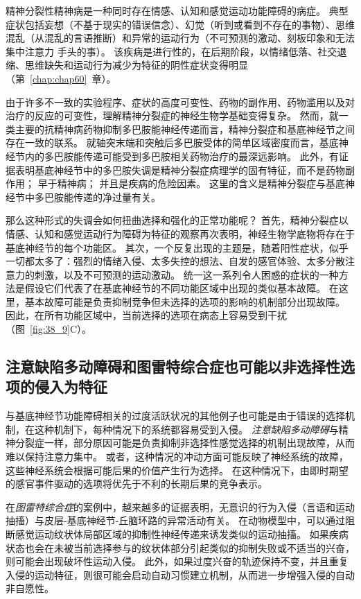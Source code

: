 精神分裂性精神病是一种同时存在情感、认知和感觉运动功能障碍的病症。
典型症状包括妄想（不基于现实的错误信念）、幻觉（听到或看到不存在的事物）、思维混乱（从混乱的言语推断）和异常的运动行为（不可预测的激动、刻板印象和无法集中注意力 手头的事）。
该疾病是进行性的，在后期阶段，以情绪低落、社交退缩、思维缺失和运动行为减少为特征的阴性症状变得明显（第~\ref{chap:chap60}~章）。


由于许多不一致的实验程序、症状的高度可变性、药物的副作用、药物滥用以及对治疗的反应的可变性，理解精神分裂症的神经生物学基础变得复杂。
然而，就一类主要的抗精神病药物抑制多巴胺能神经传递而言，精神分裂症和基底神经节之间存在一致的联系。
就轴突末端和突触后多巴胺受体的简单区域密度而言，基底神经节内的多巴胺能传递可能受到多巴胺相关药物治疗的最深远影响。
此外，有证据表明基底神经节中的多巴胺失调是精神分裂症病理学的固有特征，而不是药物副作用；
早于精神病；
并且是疾病的危险因素。
这里的含义是精神分裂症与基底神经节中多巴胺能传递的净过量有关。


那么这种形式的失调会如何扭曲选择和强化的正常功能呢？
首先，精神分裂症以情感、认知和感觉运动行为障碍为特征的观察再次表明，神经生物学底物将存在于基底神经节的每个功能区。
其次，一个反复出现的主题是，随着阳性症状，似乎一切都太多了：强烈的情绪入侵、太多失控的想法、自发的感官体验、太多分散注意力的刺激，以及不可预测的运动激动。
统一这一系列令人困惑的症状的一种方法是假设它们代表了在基底神经节的不同功能区域中出现的类似基本故障。
在这里，基本故障可能是负责抑制竞争但未选择的选项的影响的机制部分出现故障。
因此，在所有功能区域中，当前选择的选项在病态上容易受到干扰（图~\ref{fig:38_9}C）。



\subsection{注意缺陷多动障碍和图雷特综合症也可能以非选择性选项的侵入为特征}

与基底神经节功能障碍相关的过度活跃状况的其他例子也可能是由于错误的选择机制，在这种机制下，每种情况下的系统都容易受到入侵。
\textit{注意缺陷多动障碍}与精神分裂症一样，部分原因可能是负责抑制非选择性感觉选择的机制出现故障，从而难以保持注意力集中。
或者，这种情况的冲动方面可能反映了神经系统的故障，这些神经系统会根据可能后果的价值产生行为选择。
在这种情况下，由即时期望的感官事件驱动的选项将优先于不利的长期后果的竞争表示。


在\textit{图雷特综合症}的案例中，越来越多的证据表明，无意识的行为入侵（言语和运动抽搐）与皮层-基底神经节-丘脑环路的异常活动有关。
在动物模型中，可以通过阻断感觉运动纹状体局部区域的抑制性神经传递来诱发类似的运动抽搐。
如果疾病状态也会在未被当前选择参与的纹状体部分引起类似的抑制失败或不适当的兴奋，则可能会出现破坏性运动入侵。
此外，如果过度兴奋的轨迹保持不变，并且重复入侵的运动特征，则很可能会启动自动习惯建立机制，从而进一步增强入侵的自动非自愿性。



